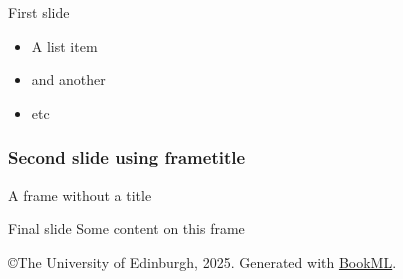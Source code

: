 \documentclass{article}
\begin{document}
\iflatexml\else
    \frame{\titlepage}
\fi


\begin{frame}{First slide}
    \begin{itemize}
        \item<1-> A list item
        \item<2-> and another
        \item<3-> etc
    \end{itemize}

\end{frame}

\begin{frame} \frametitle{Second slide using frametitle}
\end{frame}

\begin{frame}{}
    A frame without a title
\end{frame}

\begin{frame}{Final slide}
    Some content on this frame
\end{frame}






\iflatexml
    \copyright The University of Edinburgh, 2025. Generated with \href{https://vlmantova.github.io/bookml/}{BookML}.
\fi
\end{document}
